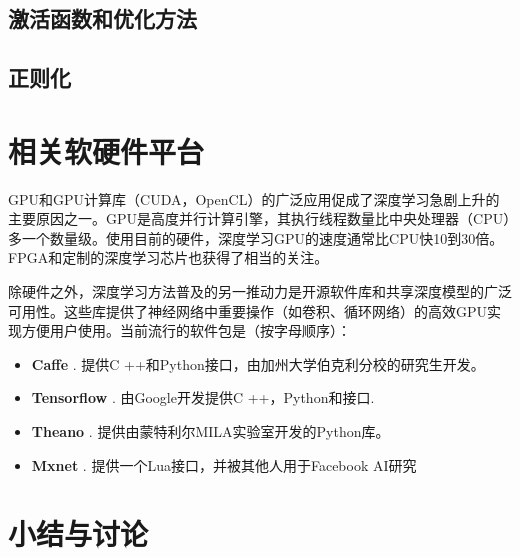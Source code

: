 \subsection{激活函数和优化方法}

\subsection{正则化}

\section{相关软硬件平台}
GPU和GPU计算库（CUDA，OpenCL）的广泛应用促成了深度学习急剧上升的主要原因之一。GPU是高度并行计算引擎，其执行线程数量比中央处理器（CPU）多一个数量级。使用目前的硬件，深度学习GPU的速度通常比CPU快10到30倍。FPGA和定制的深度学习芯片也获得了相当的关注。

除硬件之外，深度学习方法普及的另一推动力是开源软件库和共享深度模型的广泛可用性。这些库提供了神经网络中重要操作（如卷积、循环网络）的高效GPU实现方便用户使用。当前流行的软件包是（按字母顺序）：
\begin{itemize}
 \item {\bf Caffe} \citep{Jia2014}. 提供C ++和Python接口，由加州大学伯克利分校的研究生开发。
 \item {\bf Tensorflow} \citep{Abadi2016TensorFlow}. 由Google开发提供C ++，Python和接口.
 \item {\bf Theano} \citep{AlRfou2016Theano}. 提供由蒙特利尔MILA实验室开发的Python库。
 \item {\bf Mxnet} \citep{Chen2015mxnet}. 提供一个Lua接口，并被其他人用于Facebook AI研究 
\end{itemize}
 
\section{小结与讨论}

 